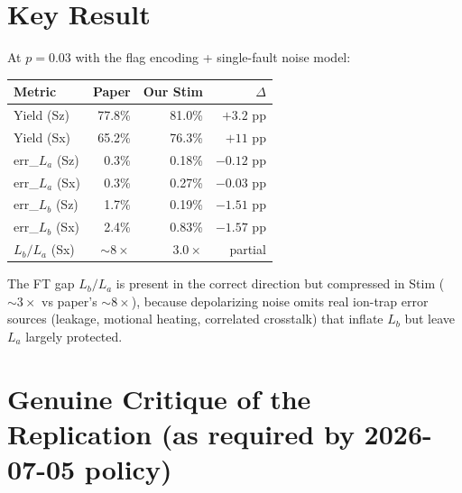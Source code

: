 \documentclass[11pt]{article}
\begin{document}
\section{Key Result}

At $p = 0.03$ with the flag encoding + single-fault noise model:

\begin{center}
\begin{tabular}{lrrr}
\toprule
Metric & Paper & Our Stim & $\Delta$ \\
\midrule
Yield (Sz)      & 77.8\% & 81.0\%   & $+3.2$ pp \\
Yield (Sx)      & 65.2\% & 76.3\%   & $+11$ pp  \\
err\_$L_a$ (Sz) & 0.3\%  & 0.18\%   & $-0.12$ pp \\
err\_$L_a$ (Sx) & 0.3\%  & 0.27\%   & $-0.03$ pp \\
err\_$L_b$ (Sz) & 1.7\%  & 0.19\%   & $-1.51$ pp \\
err\_$L_b$ (Sx) & 2.4\%  & 0.83\%   & $-1.57$ pp \\
$L_b/L_a$ (Sx)  & $\sim 8\times$ & $3.0\times$ & partial \\
\bottomrule
\end{tabular}
\end{center}

\noindent The FT gap $L_b/L_a$ is present in the correct direction but
compressed in Stim (${\sim}3\times$ vs paper's ${\sim}8\times$), because
depolarizing noise omits real ion-trap error sources (leakage, motional
heating, correlated crosstalk) that inflate $L_b$ but leave $L_a$ largely
protected.

\section{Genuine Critique of the Replication (as required by 2026-07-05 policy)}
\end{document}
